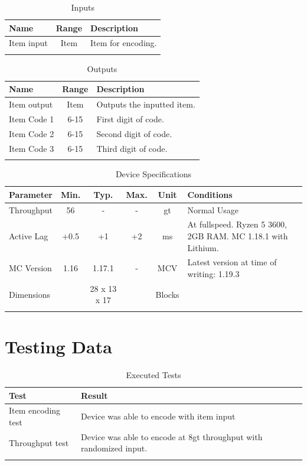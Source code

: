 \documentclass[10pt]{datasheet}
\begin{document}
\begin{table}[h]
    \caption{Inputs}
    \begin{tabularx}{\textwidth}{l | c | X}
        \thickhline
        \textbf{Name} & \textbf{Range} & \textbf{Description} \\
        \hline
        Item input & Item & Item for encoding. \\
        \thickhline
\end{tabularx}
\end{table}

\begin{table}[h]
    \caption{Outputs}
    \begin{tabularx}{\textwidth}{l | c | X}
        \thickhline
        \textbf{Name} & \textbf{Range} & \textbf{Description} \\
        \hline
        Item output & Item & Outputs the inputted item. \\
        \hline
        Item Code 1 & 6-15 & First digit of code. \\
        Item Code 2 & 6-15 & Second digit of code. \\
        Item Code 3 & 6-15 & Third digit of code. \\
        \thickhline
\end{tabularx}
\end{table}

\begin{table}[h]
    \caption{Device Specifications}
    \begin{tabularx}{\textwidth}{l | c c c | c | X}
        \thickhline
        \textbf{Parameter} & \textbf{Min.} & \textbf{Typ.} & \textbf{Max.} &
        \textbf{Unit} & \textbf{Conditions} \\
        \hline
        Throughput  & 56 & - & - & gt & Normal Usage \\
        \hline
        Active Lag & +0.5 & +1 & +2 & ms & At fullspeed. Ryzen 5 3600, 2GB RAM. MC 1.18.1 with Lithium. \\
        \hline
        MC Version & 1.16 & 1.17.1 & - & MCV & Latest version at time of writing: 1.19.3\\
        \hline
        Dimensions & & 28 x 13 x 17 & & Blocks & \\
        \thickhline
\end{tabularx}
\end{table}
\newpage
\section{Testing Data}
\begin{table}[h]
\caption{Executed Tests}
\begin{tabularx}{\textwidth}{l | X}
    \thickhline
    \textbf{Test} & \textbf{Result} \\
    \hline
    Item encoding test & Device was able to encode with item input \\
    \hline
    Throughput test & Device was able to encode at 8gt throughput with randomized input. \\
    \thickhline
\end{tabularx}
\end{table}
\end{document}
